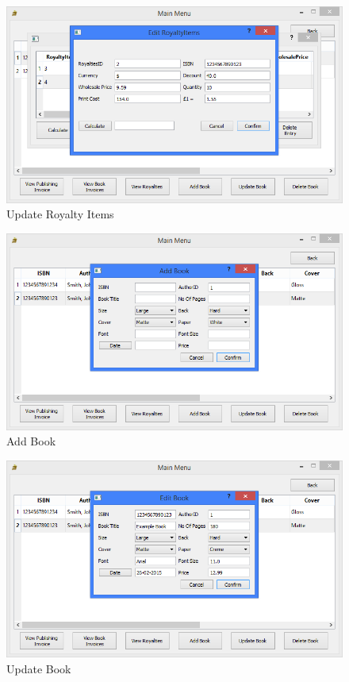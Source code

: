 \begin{figure}[H]
    \caption{Update Royalty Items} \label{fig:UpdateRoyaltyItems}
    \includegraphics[width=\textwidth]{./Maintenance/UserInterface/UpdateRoyaltyItems.png}
\end{figure}

\begin{figure}[H]
    \caption{Add Book} \label{fig:AddBook}
    \includegraphics[width=\textwidth]{./Maintenance/UserInterface/AddBook.png}
\end{figure}

\begin{figure}[H]
    \caption{Update Book} \label{fig:UpdateBook}
    \includegraphics[width=\textwidth]{./Maintenance/UserInterface/UpdateBook.png}
\end{figure}


